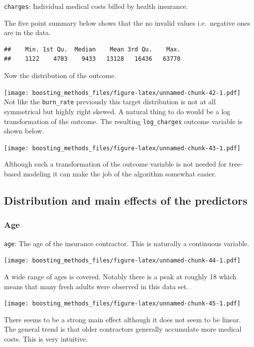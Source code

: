 \documentclass[
]{book}
\begin{document}
\texttt{charges}: Individual medical costs billed by health insurance.

The five point summary below shows that the no invalid values i.e.~negative ones are in the data.

\begin{verbatim}
##    Min. 1st Qu.  Median    Mean 3rd Qu.    Max. 
##    1122    4703    9433   13128   16436   63770
\end{verbatim}

Now the distribution of the outcome.

\texttt{[image: boosting\_methods\_files/figure-latex/unnamed-chunk-42-1.pdf]}
Not like the \texttt{burn\_rate} previously this target distribution is not at all symmetrical but highly right skewed. A natural thing to do would be a log transformation of the outcome. The resulting \texttt{log\_charges} outcome variable is shown below.

\texttt{[image: boosting\_methods\_files/figure-latex/unnamed-chunk-43-1.pdf]}

Although such a transformation of the outcome variable is not needed for tree-based modeling it can make the job of the algorithm somewhat easier.

\hypertarget{distribution-and-main-effects-of-the-predictors-1}{%
\subsection{Distribution and main effects of the predictors}\label{distribution-and-main-effects-of-the-predictors-1}}

\hypertarget{age}{%
\subsubsection{Age}\label{age}}

\texttt{age}: The age of the insurance contractor. This is naturally a continuous variable.

\texttt{[image: boosting\_methods\_files/figure-latex/unnamed-chunk-44-1.pdf]}

A wide range of ages is covered. Notably there is a peak at roughly 18 which means that many fresh adults were observed in this data set.

\texttt{[image: boosting\_methods\_files/figure-latex/unnamed-chunk-45-1.pdf]}

There seems to be a strong main effect although it does not seem to be linear. The general trend is that older contractors generally accumulate more medical costs. This is very intuitive.
\end{document}
